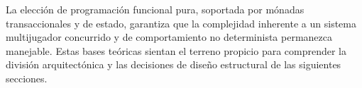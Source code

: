 \vspace{0.5cm}
\noindent La elección de programación funcional pura, soportada por mónadas transaccionales y de estado, garantiza que la complejidad inherente a un sistema multijugador concurrido y de comportamiento no determinista permanezca manejable. Estas bases teóricas sientan el terreno propicio para comprender la división arquitectónica y las decisiones de diseño estructural de las siguientes secciones.

\clearpage